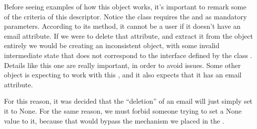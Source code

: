 \documentclass[a4paper,10pt,english]{sphinxmanual}
\begin{document}
\begin{sphinxVerbatim}[commandchars=\\\{\}]
 

      

               
          
          
            \PYG{p}{[}\PYG{p}{]}

     
         
\end{sphinxVerbatim}

Before seeing examples of how this object works, it’s important to remark some of the
criteria of this descriptor. Notice the  class requires the  and  as
mandatory parameters. According to its  method, it cannot be a user if it doesn’t
have an email attribute. If we were to delete that attribute, and extract it from the object
entirely we would be creating an inconsistent object, with some invalid intermediate state
that does not correspond to the interface defined by the class . Details like this one are
really important, in order to avoid issues. Some other object is expecting to work with this
, and it also expects that it has an email attribute.

For this reason, it was decided that the “deletion” of an email will just simply set it to None. For the same reason, we must forbid
someone trying to set a None value to it, because that would bypass the mechanism we placed in the .
\end{document}
